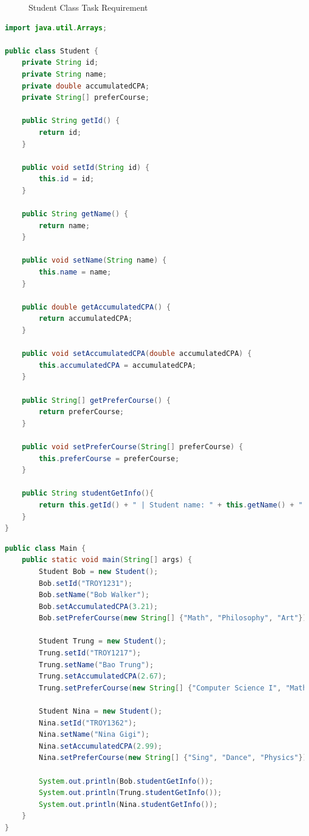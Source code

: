 \documentclass{article}
\begin{document}
\begin{figure}[h]
    \centering
    \caption{Student Class Task Requirement}
\end{figure}

\begin{lstlisting}[language=Java, caption=Student.java]
import java.util.Arrays;

public class Student {
    private String id;
    private String name;
    private double accumulatedCPA;
    private String[] preferCourse;

    public String getId() {
        return id;
    }

    public void setId(String id) {
        this.id = id;
    }

    public String getName() {
        return name;
    }

    public void setName(String name) {
        this.name = name;
    }

    public double getAccumulatedCPA() {
        return accumulatedCPA;
    }

    public void setAccumulatedCPA(double accumulatedCPA) {
        this.accumulatedCPA = accumulatedCPA;
    }

    public String[] getPreferCourse() {
        return preferCourse;
    }

    public void setPreferCourse(String[] preferCourse) {
        this.preferCourse = preferCourse;
    }

    public String studentGetInfo(){
        return this.getId() + " | Student name: " + this.getName() + " | Accumulated CPA:  " + this.getAccumulatedCPA() + " | Student prefer course: " + Arrays.toString(this.getPreferCourse());
    }
}
\end{lstlisting}

\begin{lstlisting}[language=Java, caption=Main.java]
public class Main {
    public static void main(String[] args) {
        Student Bob = new Student();
        Bob.setId("TROY1231");
        Bob.setName("Bob Walker");
        Bob.setAccumulatedCPA(3.21);
        Bob.setPreferCourse(new String[] {"Math", "Philosophy", "Art"});

        Student Trung = new Student();
        Trung.setId("TROY1217");
        Trung.setName("Bao Trung");
        Trung.setAccumulatedCPA(2.67);
        Trung.setPreferCourse(new String[] {"Computer Science I", "Math"});

        Student Nina = new Student();
        Nina.setId("TROY1362");
        Nina.setName("Nina Gigi");
        Nina.setAccumulatedCPA(2.99);
        Nina.setPreferCourse(new String[] {"Sing", "Dance", "Physics"});

        System.out.println(Bob.studentGetInfo());
        System.out.println(Trung.studentGetInfo());
        System.out.println(Nina.studentGetInfo());
    }
}
\end{lstlisting}
\end{document}
